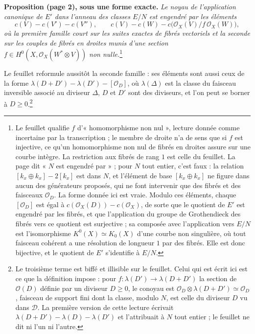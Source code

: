 \documentclass[11pt,a4paper]{article}
\begin{document}
\textbf{Proposition (page 2), sous une forme exacte.} \emph{Le noyau de
l'application canonique de $E'$ dans l'anneau des classes $E/N$ est engendré
par les éléments}
\[
  c(V) - c(V') - c(V''), \qquad
  c(V) - c(W) - c\bigl(\mathcal{O}_{X}(V)/f\,\mathcal{O}_{X}(W)\bigr),
\]
\emph{où la première famille court sur les suites exactes de fibrés
vectoriels et la seconde sur les couples de fibrés en droites munis d'une
section} $f \in H^{0}(X, \mathcal{O}_{X}(W^{*} \otimes V))$ \emph{non
nulle.}\footnote{Le feuillet qualifie $f$ d'« homomorphisme non nul », lecture
donnée comme incertaine par la transcription ; le membre de droite n'a de sens
que si $f$ est injective, ce qu'un homomorphisme non nul de fibrés en droites
assure sur une courbe intègre. La restriction aux fibrés de rang $1$ est celle
du feuillet. La page dit « $N$ est engendré par » ; pour $N$ tout entier,
c'est faux : la relation $[k_{x} \oplus k_{x}] - 2[k_{x}]$ est dans $N$, et
l'élément de base $[k_{x} \oplus k_{x}]$ ne figure dans aucun des générateurs
proposés, qui ne font intervenir que des fibrés et des faisceaux
$\mathcal{O}_{D}$. La forme donnée ici est vraie. Modulo ces éléments, chaque
$[\mathcal{O}_{D}]$ est égal à $c(\mathcal{O}_{X}(D)) - c(\mathcal{O}_{X})$, de
sorte que le quotient de $E'$ est engendré par les fibrés, et que l'application
du groupe de Grothendieck des fibrés vers ce quotient est surjective ; sa
composée avec l'application vers $E/N$ est l'isomorphisme $K^{0}(X) \simeq
K_{0}(X)$ d'une courbe non singulière, où tout faisceau cohérent a une
résolution de longueur $1$ par des fibrés. Elle est donc bijective, et le
quotient de $E'$ s'identifie à $E/N$.}

Le feuillet reformule aussitôt la seconde famille : ses éléments sont aussi
ceux de la forme $\lambda(D + D') - \lambda(D') - [\mathcal{O}_{D}]$, où
$\lambda(\Delta)$ est la classe du faisceau inversible associé au diviseur
$\Delta$, $D$ et $D'$ sont des diviseurs, et l'on peut se borner à
$D \geqslant 0$.\footnote{Le troisième terme est biffé et illisible sur le
feuillet. Celui qui est écrit ici est ce que la définition impose : pour
$f : \lambda(D') \to \lambda(D + D')$ la section de $\mathcal{O}(D)$ définie par
un diviseur $D \geqslant 0$, le conoyau est $\mathcal{O}_{D} \otimes
\lambda(D+D') \simeq \mathcal{O}_{D}$, faisceau de support fini dont la classe,
modulo $N$, est celle du diviseur $D$ vu dans $\mathcal{D}$. La première version de
cette lecture écrivait $\lambda(D + D') - \lambda(D) - \lambda(D')$ et
l'attribuait à $N$ tout entier ; le feuillet ne dit ni l'un ni l'autre.}
\end{document}
